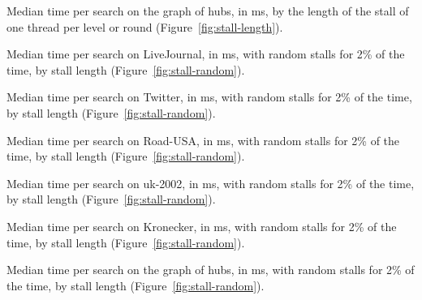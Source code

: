\begin{table}[H]
    \caption{Median time per search on the graph of hubs, in ms, by the length of the stall of one thread per level or round (Figure~\ref{fig:stall-length}).}
    \label{tab:app-stall-hubs}
    \centering
\end{table}

\begin{table}[H]
    \caption{Median time per search on LiveJournal, in ms, with random stalls for 2\% of the time, by stall length (Figure~\ref{fig:stall-random}).}
    \label{tab:app-noise-lj}
    \centering
\end{table}

\begin{table}[H]
    \caption{Median time per search on Twitter, in ms, with random stalls for 2\% of the time, by stall length (Figure~\ref{fig:stall-random}).}
    \label{tab:app-noise-twitter}
    \centering
\end{table}

\begin{table}[H]
    \caption{Median time per search on Road-USA, in ms, with random stalls for 2\% of the time, by stall length (Figure~\ref{fig:stall-random}).}
    \label{tab:app-noise-road}
    \centering
\end{table}

\begin{table}[H]
    \caption{Median time per search on uk-2002, in ms, with random stalls for 2\% of the time, by stall length (Figure~\ref{fig:stall-random}).}
    \label{tab:app-noise-uk}
    \centering
\end{table}

\begin{table}[H]
    \caption{Median time per search on Kronecker, in ms, with random stalls for 2\% of the time, by stall length (Figure~\ref{fig:stall-random}).}
    \label{tab:app-noise-kron}
    \centering
\end{table}

\begin{table}[H]
    \caption{Median time per search on the graph of hubs, in ms, with random stalls for 2\% of the time, by stall length (Figure~\ref{fig:stall-random}).}
    \label{tab:app-noise-hubs}
    \centering
\end{table}

